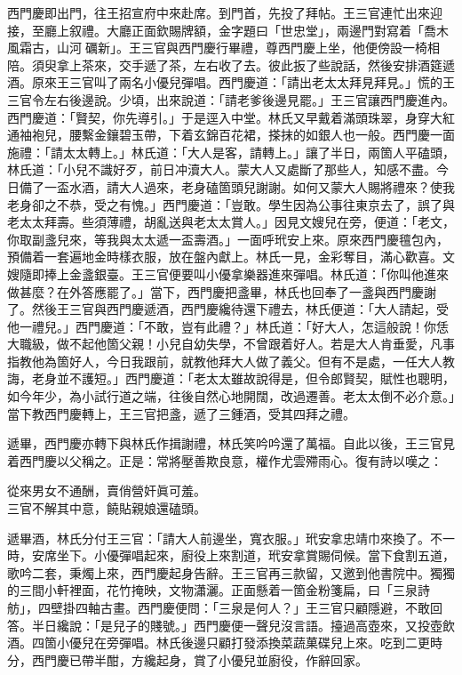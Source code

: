 西門慶即出門，往王招宣府中來赴席。到門首，先投了拜帖。王三官連忙出來迎接，至廳上叙禮。大廳正面欽賜牌額，金字題曰「世忠堂」，兩邊門對寫着「喬木風霜古，山河𥕧礪新」。王三官與西門慶行畢禮，尊西門慶上坐，他便傍設一椅相陪。須臾拿上茶來，交手遞了茶，左右收了去。彼此扳了些說話，然後安排酒筵遞酒。原來王三官叫了兩名小優兒彈唱。西門慶道：「請出老太太拜見拜見。」慌的王三官令左右後邊說。少頃，出來說道：「請老爹後邊見罷。」王三官讓西門慶進內。西門慶道：「賢契，你先導引。」于是逕入中堂。林氏又早戴着滿頭珠翠，身穿大紅通袖袍兒，腰繫金鑲碧玉帶，下着玄錦百花裙，搽抹的如銀人也一般。西門慶一面施禮：「請太太轉上。」林氏道：「大人是客，請轉上。」讓了半日，兩箇人平磕頭，林氏道：「小兒不識好歹，前日冲瀆大人。蒙大人又處斷了那些人，知感不盡。今日備了一盃水酒，請大人過來，老身磕箇頭兒謝謝。如何又蒙大人賜將禮來？使我老身卻之不恭，受之有愧。」西門慶道：「豈敢。學生因為公事往東京去了，誤了與老太太拜壽。些須薄禮，胡亂送與老太太賞人。」因見文嫂兒在旁，便道：「老文，你取副盞兒來，等我與太太遞一盃壽酒。」{}一面呼玳安上來。原來西門慶氊包內，預備着一套遍地金時樣衣服，放在盤內獻上。林氏一見，金彩奪目，滿心歡喜。文嫂隨即捧上金盞銀臺。王三官便要叫小優拿樂器進來彈唱。{}林氏道：「你叫他進來做甚麼？在外答應罷了。」當下，西門慶把盞畢，林氏也回奉了一盞與西門慶謝了。然後王三官與西門慶遞酒，西門慶纔待還下禮去，林氏便道：「大人請起，受他一禮兒。」西門慶道：「不敢，豈有此禮？」林氏道：「好大人，怎這般說！你恁大職級，做不起他箇父親！小兒自幼失學，不曾跟着好人。若是大人肯垂愛，凡事指教他為箇好人，今日我跟前，就教他拜大人做了義父。{}但有不是處，一任大人教誨，老身並不護短。」西門慶道：「老太太雖故說得是，但令郎賢契，賦性也聰明，如今年少，為小試行道之端，往後自然心地開闊，改過遷善。老太太倒不必介意。」{}當下教西門慶轉上，王三官把盞，遞了三鍾酒，受其四拜之禮。

遞畢，西門慶亦轉下與林氏作揖謝禮，林氏笑吟吟還了萬福。自此以後，王三官見着西門慶以父稱之。正是：常將壓善欺良意，權作尤雲殢雨心。復有詩以嘆之：

\begin{myquote}
從來男女不通酬，賣俏營奸眞可羞。\\三官不解其中意，饒貼親娘還磕頭。
\end{myquote}

遞畢酒，林氏分付王三官：「請大人前邊坐，寬衣服。」玳安拿忠靖巾來換了。不一時，安席坐下。小優彈唱起來，廚役上來割道，玳安拿賞賜伺候。當下食割五道，歌吟二套，秉燭上來，西門慶起身告辭。王三官再三款留，又邀到他書院中。獨獨的三間小軒裡面，花竹掩映，文物瀟灑。正面懸着一箇金粉箋扁，曰「三泉詩舫」，四壁掛四軸古畫。西門慶便問：「三泉是何人？」王三官只顧隱避，不敢回答。{}半日纔說：「是兒子的賤號。」西門慶便一聲兒沒言語。擡過高壺來，又投壺飲酒。四箇小優兒在旁彈唱。林氏後邊只顧打發添換菜蔬菓碟兒上來。吃到二更時分，西門慶已帶半酣，方纔起身，賞了小優兒並廚役，作辭回家。

